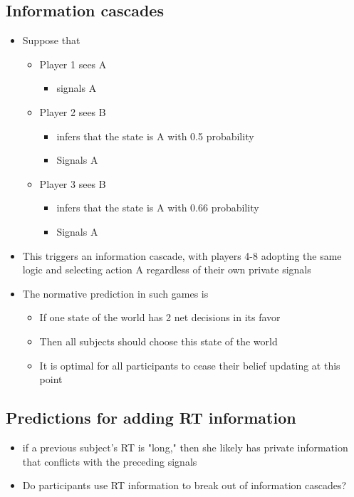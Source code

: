 \subsection{Information cascades}
\begin{itemize}
    \item Suppose that 
    \begin{itemize}
        \item Player 1 sees A
        \begin{itemize}
            \item signals A
        \end{itemize}
         \item Player 2 sees B
         \begin{itemize}
             \item infers that the state is A with 0.5 probability
             \item Signals A
         \end{itemize}
         \item Player 3 sees B
         \begin{itemize}
             \item infers that the state is A with 0.66 probability
             \item Signals A
         \end{itemize}
    \end{itemize}
    \item This triggers an information cascade, with players 4-8 adopting the same logic and selecting action A regardless of their own private signals
    \item The normative prediction in such games is 
    \begin{itemize}
        \item If one state of the world has 2 net decisions in its favor
        \item Then all subjects should choose this state of the world
        \item It is optimal for all participants to cease their belief updating at this point
    \end{itemize}
\end{itemize}

\subsection{Predictions for adding RT information}
\begin{itemize}
    \item if a previous subject's RT is "long," then she likely has private information that conflicts with the preceding signals
    \item Do participants use RT information to break out of information cascades?
\end{itemize}
